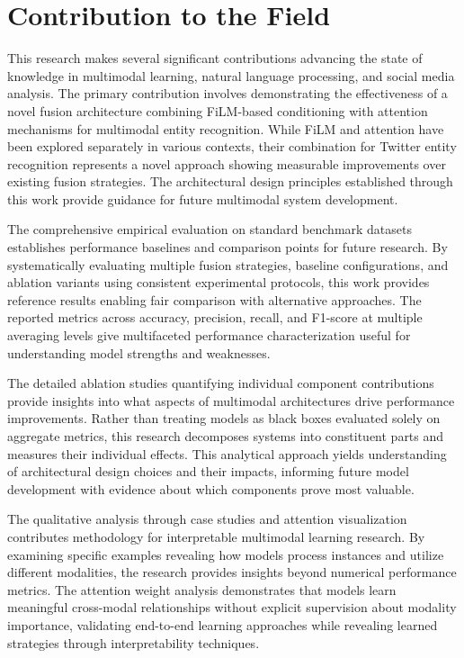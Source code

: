 \documentclass[12pt,a4paper]{report}
\begin{document}
\section{Contribution to the Field}

This research makes several significant contributions advancing the state of knowledge in multimodal learning, natural language processing, and social media analysis. The primary contribution involves demonstrating the effectiveness of a novel fusion architecture combining FiLM-based conditioning with attention mechanisms for multimodal entity recognition. While FiLM and attention have been explored separately in various contexts, their combination for Twitter entity recognition represents a novel approach showing measurable improvements over existing fusion strategies. The architectural design principles established through this work provide guidance for future multimodal system development.

The comprehensive empirical evaluation on standard benchmark datasets establishes performance baselines and comparison points for future research. By systematically evaluating multiple fusion strategies, baseline configurations, and ablation variants using consistent experimental protocols, this work provides reference results enabling fair comparison with alternative approaches. The reported metrics across accuracy, precision, recall, and F1-score at multiple averaging levels give multifaceted performance characterization useful for understanding model strengths and weaknesses.

The detailed ablation studies quantifying individual component contributions provide insights into what aspects of multimodal architectures drive performance improvements. Rather than treating models as black boxes evaluated solely on aggregate metrics, this research decomposes systems into constituent parts and measures their individual effects. This analytical approach yields understanding of architectural design choices and their impacts, informing future model development with evidence about which components prove most valuable.

The qualitative analysis through case studies and attention visualization contributes methodology for interpretable multimodal learning research. By examining specific examples revealing how models process instances and utilize different modalities, the research provides insights beyond numerical performance metrics. The attention weight analysis demonstrates that models learn meaningful cross-modal relationships without explicit supervision about modality importance, validating end-to-end learning approaches while revealing learned strategies through interpretability techniques.
\end{document}

